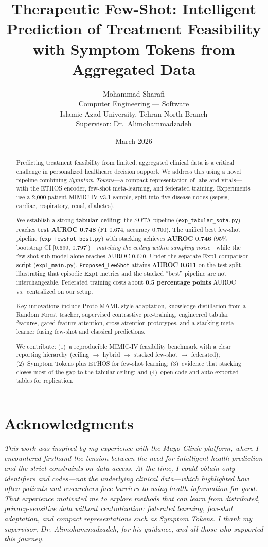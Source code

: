 \documentclass[12pt,a4paper,twoside]{report}
\title{Therapeutic Few-Shot: Intelligent Prediction of Treatment Feasibility \\
with Symptom Tokens from Aggregated Data}
\author{Mohammad Sharafi \\[0.5em]
\normalsize Computer Engineering --- Software \\
\normalsize Islamic Azad University, Tehran North Branch \\[0.5em]
\normalsize Supervisor: Dr.\ Alimohammadzadeh}
\date{March 2026}
\newenvironment{acknowledgments}
  {\chapter*{Acknowledgments}\addcontentsline{toc}{chapter}{Acknowledgments}\itshape}
  {\par\vspace{1em}}
\begin{document}
\maketitle

\begin{acknowledgments}
This work was inspired by my experience with the Mayo Clinic platform, where I encountered firsthand the tension between the need for intelligent health prediction and the strict constraints on data access. At the time, I could obtain only identifiers and codes---not the underlying clinical data---which highlighted how often patients and researchers face barriers to using health information for good. That experience motivated me to explore methods that can learn from distributed, privacy-sensitive data without centralization: federated learning, few-shot adaptation, and compact representations such as Symptom Tokens. I thank my supervisor, Dr. Alimohammadzadeh, for his guidance, and all those who supported this journey.
\end{acknowledgments}

\begin{abstract}
Predicting treatment feasibility from limited, aggregated clinical data is a critical challenge in personalized healthcare decision support. We address this using a novel pipeline combining \emph{Symptom Tokens}---a compact representation of labs and vitals---with the ETHOS encoder, few-shot meta-learning, and federated training. Experiments use a 2,000-patient MIMIC-IV v3.1 sample, split into five disease nodes (sepsis, cardiac, respiratory, renal, diabetes).

We establish a strong \textbf{tabular ceiling}: the SOTA pipeline (\texttt{exp\_tabular\_sota.py}) reaches \textbf{test AUROC 0.748} (F1 0.674, accuracy 0.700). The unified best few-shot pipeline (\texttt{exp\_fewshot\_best.py}) with stacking achieves \textbf{AUROC 0.746} (95\% bootstrap CI [0.699, 0.797])---\emph{matching the ceiling within sampling noise}---while the few-shot sub-model alone reaches AUROC 0.670. Under the separate Exp1 comparison script (\texttt{exp1\_main.py}), \texttt{Proposed\_FewShot} attains \textbf{AUROC 0.611} on the test split, illustrating that episodic Exp1 metrics and the stacked ``best'' pipeline are not interchangeable. Federated training costs about \textbf{0.5 percentage points} AUROC vs.\ centralized on our setup.

Key innovations include Proto-MAML-style adaptation, knowledge distillation from a Random Forest teacher, supervised contrastive pre-training, engineered tabular features, gated feature attention, cross-attention prototypes, and a stacking meta-learner fusing few-shot and classical predictions.

We contribute: (1)~a reproducible MIMIC-IV feasibility benchmark with a clear reporting hierarchy (ceiling $\rightarrow$ hybrid $\rightarrow$ stacked few-shot $\rightarrow$ federated); (2)~Symptom Tokens plus ETHOS for few-shot learning; (3)~evidence that stacking closes most of the gap to the tabular ceiling; and (4)~open code and auto-exported tables for replication.
\end{abstract}
\end{document}
